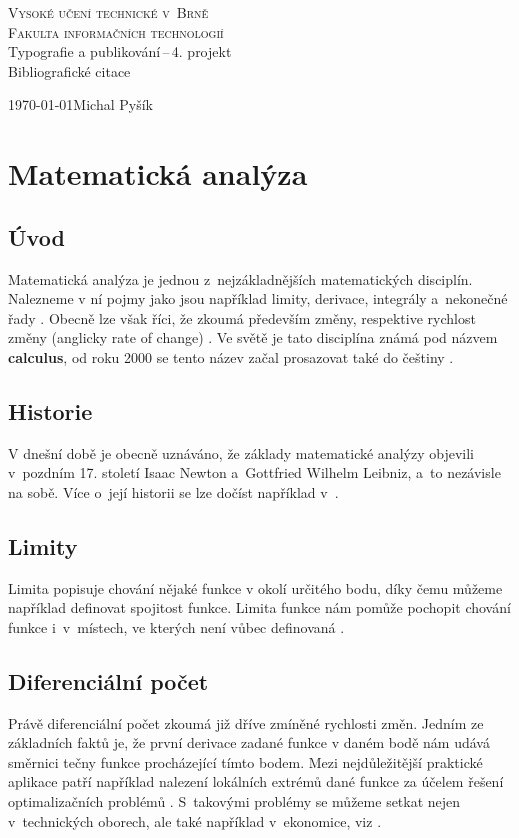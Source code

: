 \documentclass[a4paper, 11pt]{article}
\begin{document}
\begin{titlepage}
\begin{center}
    \textsc{\Huge Vysoké učení technické v~Brně\\ \huge Fakulta informačních technologií\\}
    \LARGE Typografie a publikování\,--\,4. projekt\\
    \Huge Bibliografické citace
\end{center}
\Large{\today \hfill Michal Pyšík}
\bigskip
\end{titlepage}


\section*{Matematická analýza}

\subsection*{Úvod}
Matematická analýza je jednou z~nejzákladnějších matematických disciplín. Nalezneme v ní pojmy jako jsou například limity, 
derivace, integrály a~nekonečné řady \cite{Hirschman_2014}. Obecně lze však říci, že zkoumá především změny, respektive rychlost změny
(anglicky rate of change) \cite{Cook_2017}.
Ve světě je tato disciplína známá pod názvem \textbf{calculus}, od roku 2000 se tento název začal prosazovat také do češtiny
\cite{Cerny_2002}.


\subsection*{Historie}
V dnešní době je obecně uznáváno, že základy matematické analýzy objevili v~pozdním 17. století Isaac Newton
a~Gottfried Wilhelm Leibniz, a~to nezávisle na sobě. Více o~její historii se lze dočíst například v~\cite{Rosenthal_1951}.


\subsection*{Limity}
Limita popisuje chování nějaké funkce v okolí určitého bodu, díky čemu můžeme například definovat spojitost funkce. Limita funkce nám pomůže
pochopit chování funkce i~v~místech, ve kterých není vůbec definovaná \cite{matematika_cz}.


\subsection*{Diferenciální počet}
Právě diferenciální počet zkoumá již dříve zmíněné rychlosti změn.
Jedním ze základních faktů je, že první derivace zadané funkce v daném bodě nám udává směrnici tečny funkce procházející tímto bodem.
Mezi nejdůležitější praktické aplikace patří například nalezení lokálních extrémů dané funkce za účelem řešení optimalizačních problémů
\cite{Britannica_2011_dif}. S~takovými problémy se můžeme setkat nejen v~technických oborech, ale také například v~ekonomice,
viz \cite{Jankensgard_2020}.
\end{document}
